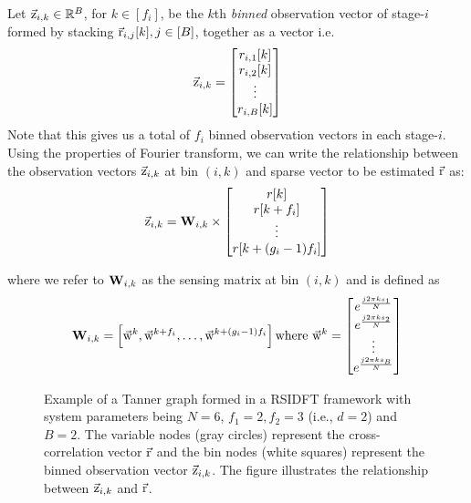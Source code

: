 	 Let $\vec{\mathrm{z}}_{i,k}\in\mathbb{R}^{B}$, for $k\in [f_i]$, be the $k$th \textit{binned} observation vector of stage-$i$ formed by stacking $\vec{\mathrm{r}}_{i,j}[k], j\in[B]$, together as a vector i.e.
\[
	  \vec{\mathrm{z}}_{i,k} = \begin{bmatrix}
	 r_{i,1}[k] \\
	 r_{i,2}[k] \\
	 \vdots\\
	 r_{i,B}[k]
	 \end{bmatrix}
\]
Note that this gives us a total of $f_i$ binned observation vectors in each stage-$i$. Using the properties of Fourier transform, we can write the relationship between the observation vectors $\vec{\mathrm{z}}_{i,k}$ at bin $(i,k)$ and sparse vector to be estimated $\vec{\mathrm{r}}$ as: 
\begin{align}
	\label{Eqn:Generator Equation}
	\vec{\mathrm{z}}_{i,k}= \mathbf{W}_{i,k} \times
	\begin{bmatrix}
		r[k] \\
		r[k+f_i] \\
		\vdots\\
		r[k+(g_i-1)f_i]
	\end{bmatrix}
\end{align}

where we refer to $\mathbf{W}_{i,k}$ as the sensing matrix at bin $(i,k)$ and is defined as
\begin{align}\label{Eqn:Sensing Matrix}
	\mathbf{W}_{i,k} = \left[\vec{\mathrm{w}}^{k},\vec{\mathrm{w}}^{k+f_i},\ldots, \vec{\mathrm{w}}^{k+(g_i-1)f_i}\right] \text{where} ~\vec{\mathrm{w}}^{k}=
	\begin{bmatrix}
		e^{\frac{j2\pi ks_1}{N}}\\
		e^{\frac{j2\pi ks_2}{N}}\\
		\vdots\\
		e^{\frac{j2\pi ks_B}{N}}
	\end{bmatrix}
\end{align}

\begin{figure}[h!]
	\begin{center}
	 	\resizebox{0.49\textwidth}{!}{}	
	\end{center}	
	\caption{Example of a Tanner graph formed in a RSIDFT framework with system parameters being $N=6$, $f_1=2, f_2=3$ (i.e., $d=2$) and $B=2$. The variable nodes (gray circles) represent the cross-correlation vector $\vec{\mathrm{r}}$ and the bin nodes (white squares) represent the binned observation vector $\vec{\mathrm{z}}_{i,k}$. The figure illustrates the relationship between $\vec{\mathrm{z}}_{i,k}$ and $\vec{\mathrm{r}}$.}\label{fig:factorgraph}
	\vspace{5 pt}
\end{figure}
 
